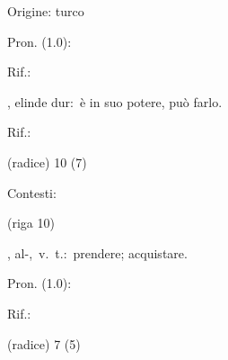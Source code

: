 \begin{glossario}{Origine: turco}
\begin{subvocedue}
\begin{subvocedue}
\item[Pron. (1.0):] 
\item[Rif.:] 
\end{subvocedue}
\item[\subglossariobullet] , {\sf elinde dur}:\ è in suo potere, può farlo.
\begin{subvocedue}
\item[Rif.:] 
\end{subvocedue}
\item[(radice)]   10 (7)
\end{subvocedue}


Contesti:
\begin{subvocedue}
\item[(riga 10)] 
\end{subvocedue}
\item[{\color{colorlowref}\spzrl{:GlB}},] {\sf al-},\ v.\ t.:\ prendere; acquistare.
\begin{subvocedue}
\item[Pron. (1.0):] 
\item[Rif.:] 
\end{subvocedue}
\begin{subvocedue}
\item[(radice)]   7 (5)
\end{subvocedue}



\end{glossario}
